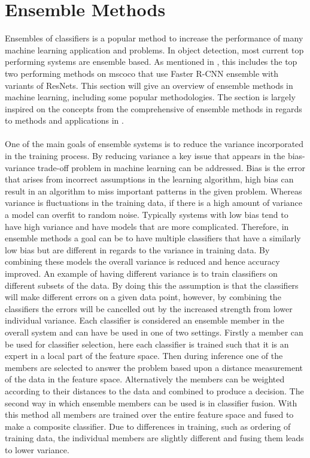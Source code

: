 \section{Ensemble Methods}
Ensembles of classifiers is a popular method to increase the performance of many machine learning application and problems. In object detection, most current top performing systems are ensemble based. As mentioned in , this includes the top two performing methods on \gls{mscoco} that use Faster R-CNN ensemble with variants of ResNets.
This section will give an overview of ensemble methods in machine learning, including some popular methodologies. The section is largely inspired on the concepts from the comprehensive of ensemble methods in regards to methods and applications in \cite{ensemblebook}.
\\\\
One of the main goals of ensemble systems is to reduce the variance incorporated in the training process. By reducing variance a key issue that appears in the bias-variance trade-off problem in machine learning can be addressed. Bias is the error that arises from incorrect assumptions in the learning algorithm, high bias can result in an algorithm to miss important patterns in the given problem. Whereas variance is fluctuations in the training data, if there is a high amount of variance a model can overfit to random noise. Typically systems with low bias tend to have high variance and have models that are more complicated. Therefore, in ensemble methods a goal can be to have multiple classifiers that have a similarly low bias but are different in regards to the variance in training data. By combining these models the overall variance is reduced and hence accuracy improved. An example of having different variance is to train classifiers on different subsets of the data. By doing this the assumption is that the classifiers will make different errors on a given data point, however, by combining the classifiers the errors will be cancelled out by the increased strength from lower individual variance. Each classifier is considered an ensemble member in the overall system and can have be used in one of two settings. Firstly a member can be used for classifier selection, here each classifier is trained such that it is an expert in a local part of the feature space. Then during inference one of the members are selected to answer the problem based upon a distance measurement of the data in the feature space. Alternatively the members can be weighted according to their distances to the data and combined to produce a decision. The second way in which ensemble members can be used is in classifier fusion. With this method all members are trained over the entire feature space and fused to make a composite classifier. Due to differences in training, such as ordering of training data, the individual members are slightly different and fusing them leads to lower variance.

